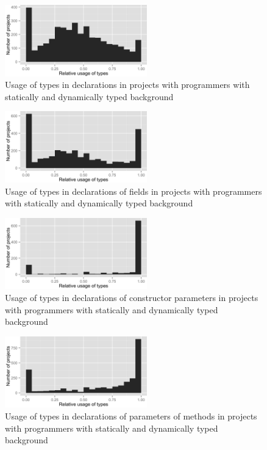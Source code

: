 \begin{figure}[h]
\centering 
\includegraphics[width=0.55\textwidth]{../aosd_2014/analysis/result/background/static-and-dynamic/histograms/5_all_types.png} 
\caption{Usage of types in declarations in projects with programmers with statically and dynamically typed background}
\end{figure}

\begin{figure}[h]
\centering 
\includegraphics[width=0.55\textwidth]{../aosd_2014/analysis/result/background/static-and-dynamic/histograms/10_Field.png} 
\caption{Usage of types in declarations of fields in projects with programmers with statically and dynamically typed background}
\end{figure}

\begin{figure}[h]
\centering 
\includegraphics[width=0.55\textwidth]{../aosd_2014/analysis/result/background/static-and-dynamic/histograms/9_Constructor_Parameter.png} 
\caption{Usage of types in declarations of constructor parameters in projects with programmers with statically and dynamically typed background}
\end{figure}

\begin{figure}[h]
\centering 
\includegraphics[width=0.55\textwidth]{../aosd_2014/analysis/result/background/static-and-dynamic/histograms/8_Method_Parameter.png} 
\caption{Usage of types in declarations of parameters of methods in projects with programmers with statically and dynamically typed background}
\end{figure}


